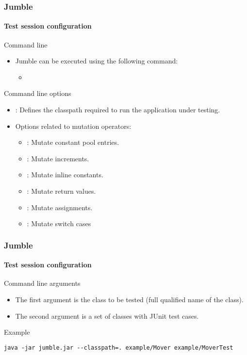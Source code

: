 \begin{frame}
\frametitle{Jumble}
\framesubtitle{Test session configuration}

\begin{block:fact}{Command line}
\begin{itemize}
	\item Jumble can be executed using the following command:
	\begin{itemize}
		\item {}
	\end{itemize}
\end{itemize}
\end{block:fact}

\begin{block:fact}{Command line options}
\begin{itemize}
	\item {}: Defines the classpath required to run the
	application under testing.
	\item Options related to mutation operators:
	\begin{itemize}
		\item {}: Mutate constant pool entries.
		\item {}: Mutate increments.
		\item {}: Mutate inline constants.
		\item {}: Mutate return values.
		\item {}: Mutate assignments.
		\item {}: Mutate switch cases
	\end{itemize}
\end{itemize}
\end{block:fact}
\end{frame}


\begin{frame}[fragile]
\frametitle{Jumble}
\framesubtitle{Test session configuration}

\begin{block:fact}{Command line arguments}
\begin{itemize}
	\item The first argument is the class to be tested (full qualified name
	of the class).
	\item The second argument is a set of classes with JUnit test cases.
\end{itemize}
\end{block:fact}

\begin{block}{Example}
\begin{lstlisting}
java -jar jumble.jar --classpath=. example/Mover example/MoverTest
\end{lstlisting}
\end{block}
\end{frame}